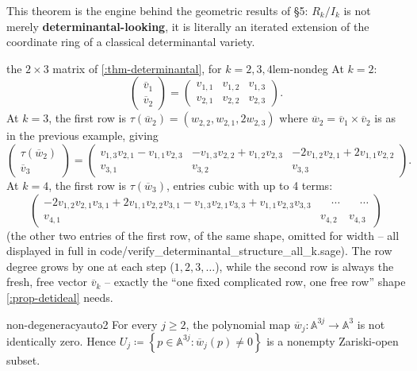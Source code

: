 \documentclass[a4paper,11pt]{scrartcl}
\begin{document}
This theorem is the engine behind the geometric results of §5: \(R_{k}/I_{k}\) is not merely \textbf{determinantal-looking}, it is literally an iterated extension of the coordinate ring of a classical determinantal variety.

\begin{example}{the \(2 \times 3\) matrix of \cref{:thm-determinantal}, for \(k = 2,3,4\)}{lem-nondeg} At \(k = 2\): \[\begin{pmatrix}
{\overline{v}}_{1} \\
{\overline{v}}_{2}
\end{pmatrix} = \begin{pmatrix}
v_{1,1} & v_{1,2} & v_{1,3} \\
v_{2,1} & v_{2,2} & v_{2,3}
\end{pmatrix}.\] At \(k = 3\), the first row is \(\tau({\overline{w}}_{2}) = \left( w_{2,2},w_{2,1},2w_{2,3} \right)\) where \({\overline{w}}_{2} = {\overline{v}}_{1} \times {\overline{v}}_{2}\) is as in the previous example, giving \[\begin{pmatrix}
\tau({\overline{w}}_{2}) \\
{\overline{v}}_{3}
\end{pmatrix} = \begin{pmatrix}
v_{1,3}v_{2,1} - v_{1,1}v_{2,3} & - v_{1,3}v_{2,2} + v_{1,2}v_{2,3} & - 2v_{1,2}v_{2,1} + 2v_{1,1}v_{2,2} \\
v_{3,1} & v_{3,2} & v_{3,3}
\end{pmatrix}.\] At \(k = 4\), the first row is \(\tau({\overline{w}}_{3})\), entries cubic with up to 4 terms: \[\begin{pmatrix}
 - 2v_{1,2}v_{2,1}v_{3,1} + 2v_{1,1}v_{2,2}v_{3,1} - v_{1,3}v_{2,1}v_{3,3} + v_{1,1}v_{2,3}v_{3,3} & \quad\cdots & \quad\cdots \\
v_{4,1} & v_{4,2} & v_{4,3}
\end{pmatrix}\] (the other two entries of the first row, of the same shape, omitted for width -- all displayed in full in code/verify\_determinantal\_structure\_all\_k.sage). The row degree grows by one at each step (\(1,2,3,\ldots\)), while the second row is always the fresh, free vector \({\overline{v}}_{k}\) -- exactly the ``one fixed complicated row, one free row'' shape \cref{:prop-detideal} needs.

\end{example}

\begin{lemma}{non-degeneracy}{auto2} For every \(j \geq 2\), the polynomial map \({\overline{w}}_{j}:\mathbb{A}^{3j} \rightarrow \mathbb{A}^{3}\) is not identically zero. Hence \(U_{j} ≔ \left\{ p \in \mathbb{A}^{3j}:{\overline{w}}_{j}(p) \neq 0 \right\}\) is a nonempty Zariski-open subset.

\end{lemma} \protect{}\label{lem-nondeg}{}
\end{document}
